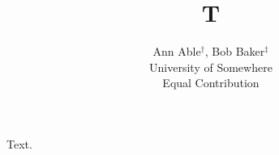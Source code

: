 \documentclass{article}
\begin{document}
\title{T}
\author{Ann Able$^{\dag}$, Bob Baker$^{\ddag}$\\ University of Somewhere\\ Equal Contribution}
\maketitle
Text.
\end{document}
